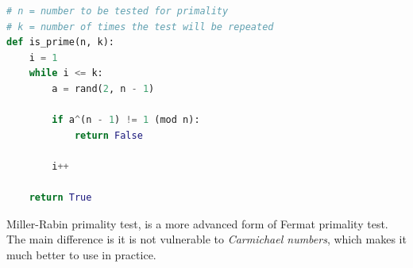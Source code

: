\documentclass[../lecture-notes.tex]{subfiles}
\begin{document}
\begin{lstlisting}[language=Python]
# n = number to be tested for primality
# k = number of times the test will be repeated
def is_prime(n, k):
    i = 1
    while i <= k:
        a = rand(2, n - 1)

        if a^(n - 1) != 1 (mod n):
            return False

        i++

    return True
\end{lstlisting}

Miller-Rabin primality test, is a more advanced form of Fermat primality test. The main difference is it is not vulnerable to \textit{Carmichael numbers},
which makes it much better to use in practice.
\end{document}

